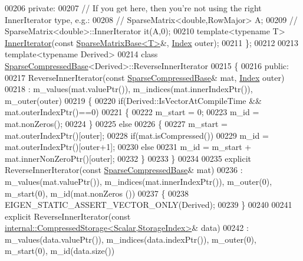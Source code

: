 \begin{DoxyCode}
00206   \textcolor{keyword}{private}:
00207     \textcolor{comment}{// If you get here, then you're not using the right InnerIterator type, e.g.:}
00208     \textcolor{comment}{//   SparseMatrix<double,RowMajor> A;}
00209     \textcolor{comment}{//   SparseMatrix<double>::InnerIterator it(A,0);}
00210     \textcolor{keyword}{template}<\textcolor{keyword}{typename} T> \hyperlink{class_eigen_1_1_inner_iterator}{InnerIterator}(\textcolor{keyword}{const} \hyperlink{group___sparse_core___module_class_eigen_1_1_sparse_matrix_base}{SparseMatrixBase<T>}&, 
      \hyperlink{group___core___module_a554f30542cc2316add4b1ea0a492ff02}{Index} outer);
00211 \};
00212 
00213 \textcolor{keyword}{template}<\textcolor{keyword}{typename} Derived>
00214 \textcolor{keyword}{class }\hyperlink{group___sparse_core___module_class_eigen_1_1_sparse_compressed_base}{SparseCompressedBase}<Derived>::ReverseInnerIterator
00215 \{
00216   \textcolor{keyword}{public}:
00217     ReverseInnerIterator(\textcolor{keyword}{const} \hyperlink{group___sparse_core___module_class_eigen_1_1_sparse_compressed_base}{SparseCompressedBase}& mat, 
      \hyperlink{group___core___module_a554f30542cc2316add4b1ea0a492ff02}{Index} outer)
00218       : m\_values(mat.valuePtr()), m\_indices(mat.innerIndexPtr()), m\_outer(outer)
00219     \{
00220       \textcolor{keywordflow}{if}(Derived::IsVectorAtCompileTime && mat.outerIndexPtr()==0)
00221       \{
00222         m\_start = 0;
00223         m\_id = mat.nonZeros();
00224       \}
00225       \textcolor{keywordflow}{else}
00226       \{
00227         m\_start = mat.outerIndexPtr()[outer];
00228         \textcolor{keywordflow}{if}(mat.isCompressed())
00229           m\_id = mat.outerIndexPtr()[outer+1];
00230         \textcolor{keywordflow}{else}
00231           m\_id = m\_start + mat.innerNonZeroPtr()[outer];
00232       \}
00233     \}
00234 
00235     \textcolor{keyword}{explicit} ReverseInnerIterator(\textcolor{keyword}{const} \hyperlink{group___sparse_core___module_class_eigen_1_1_sparse_compressed_base}{SparseCompressedBase}& mat)
00236       : m\_values(mat.valuePtr()), m\_indices(mat.innerIndexPtr()), m\_outer(0), m\_start(0), m\_id(mat.nonZeros
      ())
00237     \{
00238       EIGEN\_STATIC\_ASSERT\_VECTOR\_ONLY(Derived);
00239     \}
00240 
00241     \textcolor{keyword}{explicit} ReverseInnerIterator(\textcolor{keyword}{const} 
      \hyperlink{class_eigen_1_1internal_1_1_compressed_storage}{internal::CompressedStorage<Scalar,StorageIndex>}& data)
00242       : m\_values(data.valuePtr()), m\_indices(data.indexPtr()), m\_outer(0), m\_start(0), m\_id(data.size())

\end{DoxyCode}
